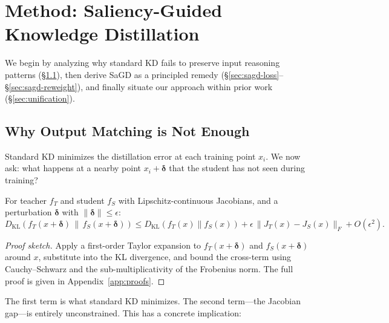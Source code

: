 
\section{Method: Saliency-Guided Knowledge Distillation}

We begin by analyzing why standard KD fails to preserve input reasoning patterns (\S\ref{sec:theory}), then derive SaGD as a principled remedy (\S\ref{sec:sagd-loss}--\S\ref{sec:sagd-reweight}), and finally situate our approach within prior work (\S\ref{sec:unification}).

\subsection{Why Output Matching is Not Enough}\label{sec:theory}

Standard KD minimizes the distillation error at each training point $x_i$. We now ask: what happens at a nearby point $x_i + \boldsymbol{\delta}$ that the student has not seen during training?

\begin{theorem}\label{thm:taylor}
For teacher $f_T$ and student $f_S$ with Lipschitz-continuous Jacobians, and a perturbation $\boldsymbol{\delta}$ with $\|\boldsymbol{\delta}\| \leq \epsilon$:
\begin{equation}\label{eq:taylor}
D_\mathrm{KL}\!\left(f_T(x + \boldsymbol{\delta}) \,\big\|\, f_S(x + \boldsymbol{\delta})\right)
\leq D_\mathrm{KL}(f_T(x) \| f_S(x)) + \epsilon \, \|J_T(x) - J_S(x)\|_F + O(\epsilon^2).
\end{equation}
\end{theorem}

\begin{proof}[Proof sketch]
Apply a first-order Taylor expansion to $f_T(x + \boldsymbol{\delta})$ and $f_S(x + \boldsymbol{\delta})$ around $x$, substitute into the KL divergence, and bound the cross-term using Cauchy--Schwarz and the sub-multiplicativity of the Frobenius norm. The full proof is given in Appendix~\ref{app:proofs}.
\end{proof}

The first term is what standard KD minimizes. The second term---the Jacobian gap---is entirely unconstrained. This has a concrete implication:

